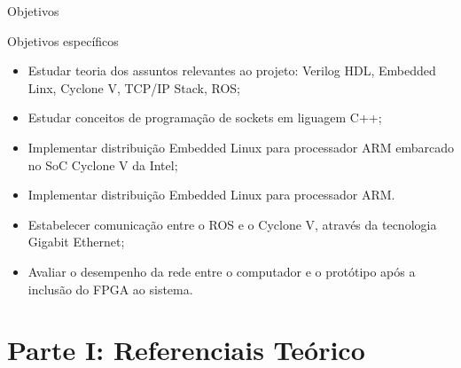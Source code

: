 \documentclass[10pt]{beamer}
\begin{document}
\begin{frame}{Objetivos}
	\begin{alertblock}{Objetivos específicos}
        \begin{itemize}
        	\item Estudar teoria dos assuntos relevantes ao projeto: Verilog HDL, Embedded Linx,
			Cyclone V, TCP/IP Stack, ROS;
        	\item Estudar conceitos de programação de sockets em liguagem C++;
        	\item Implementar distribuição Embedded Linux para processador ARM embarcado no
			SoC Cyclone V da Intel;
        	\item Implementar distribuição Embedded Linux para processador ARM.
        	\item Estabelecer comunicação entre o ROS e o Cyclone V, através da tecnologia Gigabit
			Ethernet;
        	\item Avaliar o desempenho da rede entre o computador e o protótipo após a inclusão do
			FPGA ao sistema.
        \end{itemize}
	\end{alertblock}
\end{frame}




\section{Parte I: Referenciais Teórico}




\end{document}
